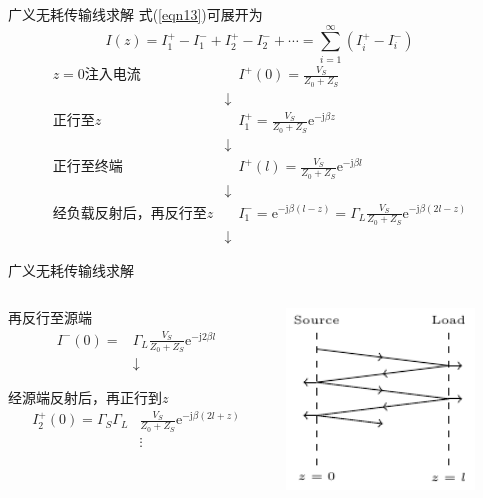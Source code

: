 \begin{frame}{广义无耗传输线求解}
  式(\ref{eqn13})可展开为
  $$I(z)=I_1^+-I_1^-+I_2^+-I_2^-+\cdots=\sum_{i=1}^{\infty}(I_i^+-I_i^-)$$
  \begin{align*}
    z=0\text{注入电流} &\quad I^+(0)=\frac{V_S}{Z_0+Z_S}\\
    &\downarrow\\
    \text{正行至}z &\quad I_1^+=\frac{V_S}{Z_0+Z_S}\mathrm{e}^{-\mathrm{j}\beta z}\\
    &\downarrow\\
    \text{正行至终端} &\quad I^+(l)=\frac{V_S}{Z_0+Z_S}\mathrm{e}^{-\mathrm{j}\beta l}\\
    &\downarrow\\
    \text{经负载反射后，再反行至}z &\quad I_1^-=\mathrm{e}^{-\mathrm{j}\beta (l-z)}=\Gamma_L\frac{V_S}{Z_0+Z_S}\mathrm{e}^{-\mathrm{j}\beta (2l-z)}\\
    &\downarrow
  \end{align*}
\end{frame}

\begin{frame}{广义无耗传输线求解}
  \begin{columns}
    \begin{column}{0.5\linewidth}
      \begin{center}
        再反行至源端
        \begin{align*}
          I^-(0)= & \Gamma_L\frac{V_S}{Z_0+Z_S}\mathrm{e}^{-\mathrm{j}2\beta l} \\
                  & \downarrow
        \end{align*}
      \end{center}

      \begin{center}
        经源端反射后，再正行到$z$
        \begin{align*}
          I_2^+(0)= \Gamma_S\Gamma_L&\frac{V_S}{Z_0+Z_S}\mathrm{e}^{-\mathrm{j}\beta(2l+z)} \\
                    & \vdots
        \end{align*}
      \end{center}

    \end{column}
    \begin{column}{0.5\linewidth}
      \includegraphics[width=5cm]{Cha3//fig3-17.pdf}
    \end{column}
  \end{columns}

\end{frame}


